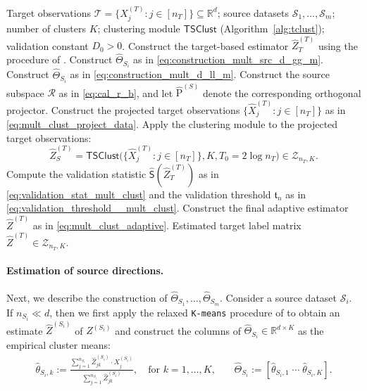\documentclass[10pt]{article}
\newcommand{\R}{\mathbb R}
\newcommand{\wh}{\widehat}
\newcommand{\calT}{\mathcal T}
\newcommand{\trg}{T}
\newcommand{\nT}{n_{\trg}}
\newcommand{\Xtar}{X^{(\trg)}}
\newcommand{\hatXtar}{\wh{X}^{(\trg)}}
\newcommand{\hatZtar}{\wh{Z}^{(\trg)}}
\newcommand{\calS}{\mathcal S}
\newcommand{\src}{S}
\newcommand{\nSm}[1]{n_{\src_{#1}}}
\newcommand{\Xsrcm}[1]{X^{(\src_{#1})}}
\newcommand{\Zsrcm}[1]{Z^{(\src_{#1})}}
\newcommand{\hatThetaS}[1]{\wh{\Theta}_{S_{#1}}}
\newcommand{\Pest}{\wh{\mathrm P}}
\newcommand{\clustmodule}{\mathsf{TSClust}}
\begin{document}
\begin{algorithm}[tb]
\caption{Adaptive Transfer-Assisted Projected Clustering}
\label{alg:projected_clustering_mult}
\begin{algorithmic}[1]
\Require
Target observations $\calT=\{\Xtar_j:j\in[\nT]\}\subseteq\R^d$;
source datasets $\calS_1,\ldots,\calS_m$;
number of clusters $K$; clustering module $\clustmodule$ (Algorithm~\ref{alg:tclust});
validation constant $D_0>0$.
\State Construct the target-based estimator $\hatZtar_\trg$ using the procedure of \citet{giraud2019partial}.
    \If{$\nSm{i}\ll d$}
        \State Construct $\hatThetaS{i}$ as in
        \eqref{eq:construction_mult_src_d_gg_m}.
    \ElsIf{$4\le d\lesssim \nSm{i}$}
        \State Construct $\hatThetaS{i}$ as in
        \eqref{eq:construction_mult_d_ll_m}.
    \EndIf
\EndFor
\State Construct the source subspace $\mathcal R$ as in \eqref{eq:cal_r_b},
and let $\Pest^{(\src)}$ denote the corresponding orthogonal projector.
\State Construct the projected target observations
$\{\hatXtar_j:j\in[\nT]\}$ as in \eqref{eq:mult_clust_project_data}.
\State Apply the clustering module to the projected target observations:
\[
\hatZtar_\src=\clustmodule\bigl(\{\hatXtar_j:j\in[\nT]\},K,T_0=2\log\nT\bigr)\in \mathcal Z_{\nT,K}.
\]
\State Compute the validation statistic $\wh{\mathsf S}(\hatZtar_\trg)$
as in \eqref{eq:validation_stat_mult_clust} and the validation threshold $\mathfrak t_n$ as in
\eqref{eq:validation_threshold__mult_clust}.
\State Construct the final adaptive estimator $\hatZtar$ as in
\eqref{eq:mult_clust_adaptive}.
\Output Estimated target label matrix $\hatZtar\in\mathcal Z_{\nT,K}$.
\end{algorithmic}
\end{algorithm}

\paragraph{Estimation of source directions.}
Next, we describe the construction of $\hatThetaS{1},\ldots,\hatThetaS{m}$. Consider a source dataset $\calS_i$. If $\nSm{i}\ll d$, then we first apply the relaxed \texttt{K-means} procedure of \cite{giraud2019partial} to obtain an estimate $\wh Z^{(\src_i)}$ of $\Zsrcm{i}$ and construct the columns of $\hatThetaS{i}\in\R^{d\times K}$ as the empirical cluster means:
\begin{align}
\label{eq:construction_mult_src_d_gg_m}
    \wh{\theta}_{\src_i,k}
    :=\frac{\sum_{j=1}^{\nSm{i}}\wh Z^{(\src_i)}_{jk}\cdot \Xsrcm{i}_j}
    {\sum_{j=1}^{\nSm{i}}\wh Z^{(\src_i)}_{jk}},
    \quad \mbox{for $k=1,\ldots,K$,}
    \qquad
    \hatThetaS{i}:=\left[\wh{\theta}_{\src_i,1}\;\cdots\;\wh{\theta}_{\src_i,K}\right].
\end{align}
\end{document}

